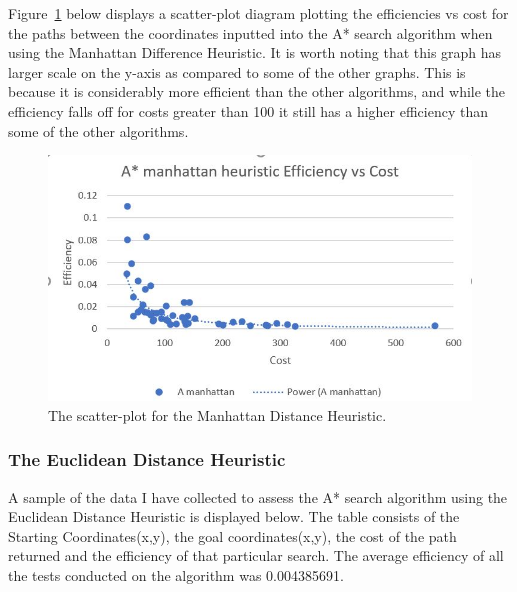 \documentclass[11pt,oneside]{article}
\begin{document}
    Figure~\ref{fig:MDEvC} below displays a scatter-plot diagram plotting the efficiencies vs cost for the paths between the coordinates inputted into the A* search algorithm when using the Manhattan Difference Heuristic. It is worth noting that this graph has larger scale on the y-axis as compared to some of the other graphs. This is because it is considerably more efficient than the other algorithms, and while the efficiency falls off for costs greater than 100 it still has a higher efficiency than some of the other algorithms.

    \begin{figure}[H]
    \centering
      \includegraphics[scale=0.8]{MD efficiency vs cost.JPG}
      \caption{The scatter-plot for the Manhattan Distance Heuristic.}
      \label{fig:MDEvC}
    \end{figure} 

\subsubsection{The Euclidean Distance Heuristic}

A sample of the data I have collected to assess the A* search algorithm using the Euclidean Distance Heuristic is displayed below. The table consists of the Starting Coordinates(x,y), the goal coordinates(x,y), the cost of the path returned and the efficiency of that particular search. The average efficiency of all the tests conducted on the algorithm was 0.004385691. 
\end{document}
